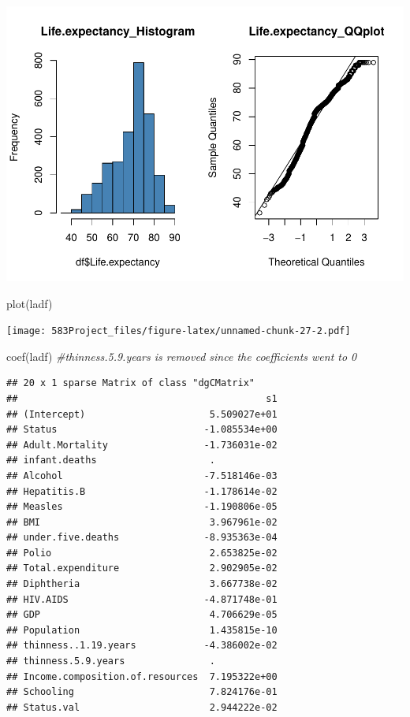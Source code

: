 \documentclass[
]{article}
\newenvironment{Shaded}{\begin{snugshade}}{\end{snugshade}}
\newcommand{\CommentTok}[1]{\textcolor[rgb]{0.56,0.35,0.01}{\textit{#1}}}
\newcommand{\FunctionTok}[1]{\textcolor[rgb]{0.00,0.00,0.00}{#1}}
\newcommand{\NormalTok}[1]{#1}
\begin{document}
\includegraphics{583Project_files/figure-latex/unnamed-chunk-27-1.pdf}

\begin{Shaded}
\begin{Highlighting}[]
\FunctionTok{plot}\NormalTok{(ladf)}
\end{Highlighting}
\end{Shaded}

\texttt{[image: 583Project\_files/figure-latex/unnamed-chunk-27-2.pdf]}

\begin{Shaded}
\begin{Highlighting}[]
\FunctionTok{coef}\NormalTok{(ladf) }\CommentTok{\#thinness.5.9.years is removed since the coefficients went to 0}
\end{Highlighting}
\end{Shaded}

\begin{verbatim}
## 20 x 1 sparse Matrix of class "dgCMatrix"
##                                            s1
## (Intercept)                      5.509027e+01
## Status                          -1.085534e+00
## Adult.Mortality                 -1.736031e-02
## infant.deaths                    .           
## Alcohol                         -7.518146e-03
## Hepatitis.B                     -1.178614e-02
## Measles                         -1.190806e-05
## BMI                              3.967961e-02
## under.five.deaths               -8.935363e-04
## Polio                            2.653825e-02
## Total.expenditure                2.902905e-02
## Diphtheria                       3.667738e-02
## HIV.AIDS                        -4.871748e-01
## GDP                              4.706629e-05
## Population                       1.435815e-10
## thinness..1.19.years            -4.386002e-02
## thinness.5.9.years               .           
## Income.composition.of.resources  7.195322e+00
## Schooling                        7.824176e-01
## Status.val                       2.944222e-02
\end{verbatim}
\end{document}
